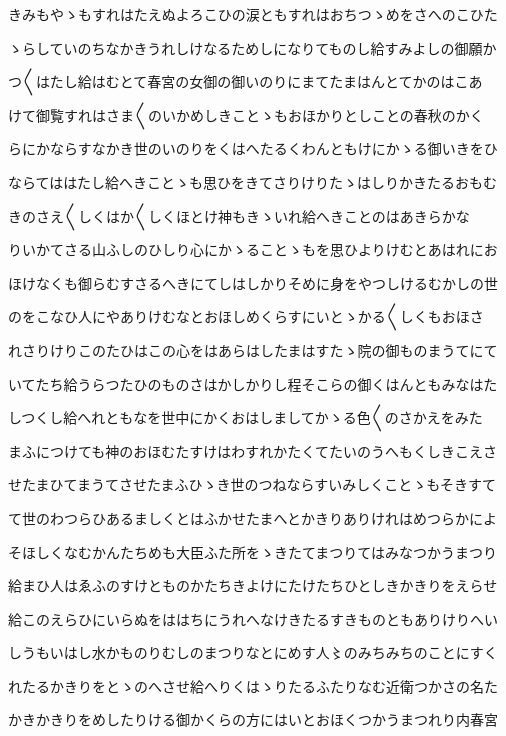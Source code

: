 \documentclass[a4paper,11pt,landscape]{ltjtarticle}
\begin{document}
きみもやゝもすれはたえぬよろこひの涙ともすれはおちつゝめをさへのこひた
\par\medskip
ゝらしていのちなかきうれしけなるためしになりてものし給すみよしの御願か
\par\medskip
つ〱はたし給はむとて春宮の女御の御いのりにまてたまはんとてかのはこあ
\par\medskip
けて御覧すれはさま〱のいかめしきことゝもおほかりとしことの春秋のかく
\par\medskip
らにかならすなかき世のいのりをくはへたるくわんともけにかゝる御いきをひ
\par\medskip
ならてははたし給へきことゝも思ひをきてさりけりたゝはしりかきたるおもむ
\par\medskip
きのさえ〱しくはか〱しくほとけ神もきゝいれ給へきことのはあきらかな
\par\medskip
りいかてさる山ふしのひしり心にかゝることゝもを思ひよりけむとあはれにお
\par\medskip
ほけなくも御らむすさるへきにてしはしかりそめに身をやつしけるむかしの世
\par\medskip
のをこなひ人にやありけむなとおほしめくらすにいとゝかる〱しくもおほさ
\par\medskip
れさりけりこのたひはこの心をはあらはしたまはすたゝ院の御ものまうてにて
\par\medskip
いてたち給うらつたひのものさはかしかりし程そこらの御くはんともみなはた
\par\medskip
しつくし給へれともなを世中にかくおはしましてかゝる色〱のさかえをみた
\par\medskip
まふにつけても神のおほむたすけはわすれかたくてたいのうへもくしきこえさ
\par\medskip
せたまひてまうてさせたまふひゝき世のつねならすいみしくことゝもそきすて
\par\medskip
て世のわつらひあるましくとはふかせたまへとかきりありけれはめつらかによ
\par\medskip
そほしくなむかんたちめも大臣ふた所をゝきたてまつりてはみなつかうまつり
\par\medskip
給まひ人はゑふのすけとものかたちきよけにたけたちひとしきかきりをえらせ
\par\medskip
給このえらひにいらぬをははちにうれへなけきたるすきものともありけりへい
\par\medskip
しうもいはし水かものりむしのまつりなとにめす人〻のみちみちのことにすく
\par\medskip
れたるかきりをとゝのへさせ給へりくはゝりたるふたりなむ近衛つかさの名た
\par\medskip
かきかきりをめしたりける御かくらの方にはいとおほくつかうまつれり内春宮
\end{document}
